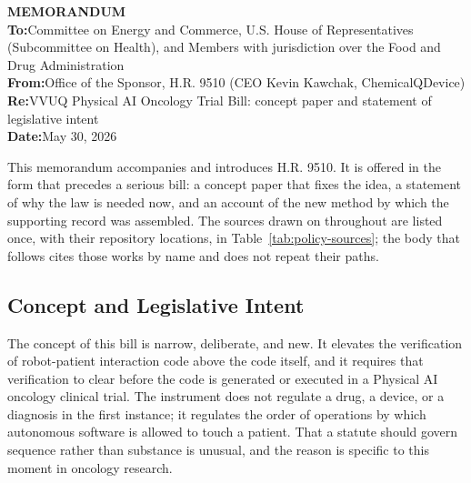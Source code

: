 
\begin{flushleft}
\textbf{MEMORANDUM}\\[3pt]
\textbf{To:}\quad Committee on Energy and Commerce, U.S. House of Representatives
(Subcommittee on Health), and Members with jurisdiction over the Food and Drug
Administration\\
\textbf{From:}\quad Office of the Sponsor, H.R. 9510 (CEO Kevin Kawchak,
ChemicalQDevice)\\
\textbf{Re:}\quad VVUQ Physical AI Oncology Trial Bill: concept paper and
statement of legislative intent\\
\textbf{Date:}\quad May 30, 2026
\end{flushleft}

This memorandum accompanies and introduces H.R. 9510. It is offered in the form
that precedes a serious bill: a concept paper that fixes the idea, a statement of
why the law is needed now, and an account of the new method by which the
supporting record was assembled. The sources drawn on throughout are listed once,
with their repository locations, in Table~\ref{tab:policy-sources}; the body that
follows cites those works by name and does not repeat their paths.

\subsection{Concept and Legislative Intent}

The concept of this bill is narrow, deliberate, and new. It elevates the
verification of robot-patient interaction code above the code itself, and it
requires that verification to clear before the code is generated or executed in a
Physical AI oncology clinical trial. The instrument does not regulate a drug, a
device, or a diagnosis in the first instance; it regulates the order of
operations by which autonomous software is allowed to touch a patient. That a
statute should govern sequence rather than substance is unusual, and the reason
is specific to this moment in oncology research.

